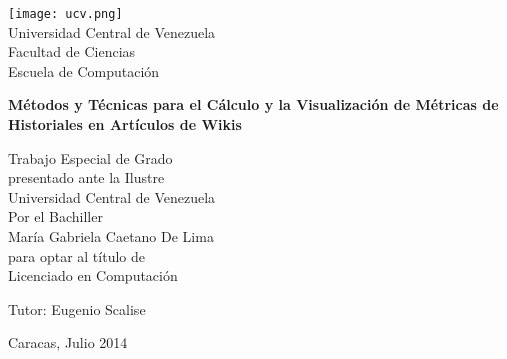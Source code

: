 \begin{titlepage}
  \begin{center}
    \texttt{[image: ucv.png]}\\
    Universidad Central de Venezuela\\
    Facultad de Ciencias\\
    Escuela de Computación\\

    \vfill

    \Large
    \textbf{Métodos y Técnicas para el Cálculo y la Visualización de Métricas de Historiales en Artículos de Wikis}

    \vspace{3cm}

    \normalsize
    Trabajo Especial de Grado\\ 
    presentado ante la Ilustre\\
    Universidad Central de Venezuela\\
    Por el Bachiller\\
    María Gabriela Caetano De Lima\\
    para optar al título de\\
    Licenciado en Computación

    \vspace{1cm}

    Tutor: Eugenio Scalise

    \vfill

    Caracas, Julio 2014

  \end{center}
\end{titlepage}
